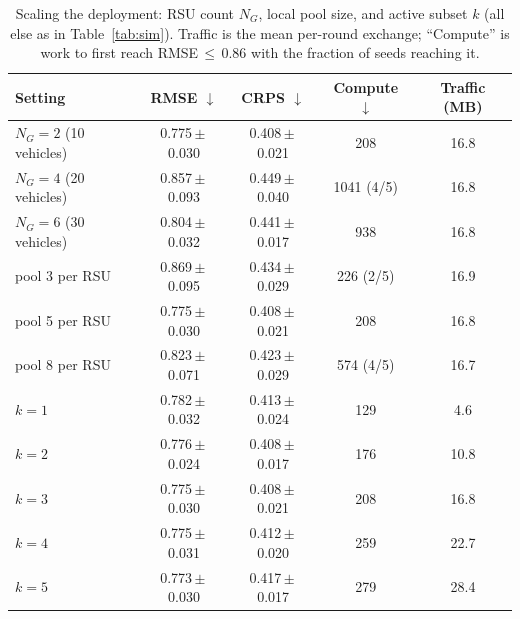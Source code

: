 \begin{table}[!t]\centering
\caption{Scaling the deployment: RSU count $N_G$, local pool size, and active subset $k$ (all else as in Table~\ref{tab:sim}). Traffic is the mean per-round exchange; ``Compute'' is work to first reach RMSE\,$\leq$\,0.86 with the fraction of seeds reaching it.}
\label{tab:scale}
\begin{tabular}{lcccc}\toprule
Setting & RMSE $\downarrow$ & CRPS $\downarrow$ & Compute $\downarrow$ & Traffic (MB) \\\midrule
$N_G=2$ (10 vehicles) & 0.775\,$\pm$\,0.030 & 0.408\,$\pm$\,0.021 & 208 & 16.8 \\
$N_G=4$ (20 vehicles) & 0.857\,$\pm$\,0.093 & 0.449\,$\pm$\,0.040 & 1041 (4/5) & 16.8 \\
$N_G=6$ (30 vehicles) & 0.804\,$\pm$\,0.032 & 0.441\,$\pm$\,0.017 & 938 & 16.8 \\
\midrule
pool 3 per RSU & 0.869\,$\pm$\,0.095 & 0.434\,$\pm$\,0.029 & 226 (2/5) & 16.9 \\
pool 5 per RSU & 0.775\,$\pm$\,0.030 & 0.408\,$\pm$\,0.021 & 208 & 16.8 \\
pool 8 per RSU & 0.823\,$\pm$\,0.071 & 0.423\,$\pm$\,0.029 & 574 (4/5) & 16.7 \\
\midrule
$k=1$ & 0.782\,$\pm$\,0.032 & 0.413\,$\pm$\,0.024 & 129 & 4.6 \\
$k=2$ & 0.776\,$\pm$\,0.024 & 0.408\,$\pm$\,0.017 & 176 & 10.8 \\
$k=3$ & 0.775\,$\pm$\,0.030 & 0.408\,$\pm$\,0.021 & 208 & 16.8 \\
$k=4$ & 0.775\,$\pm$\,0.031 & 0.412\,$\pm$\,0.020 & 259 & 22.7 \\
$k=5$ & 0.773\,$\pm$\,0.030 & 0.417\,$\pm$\,0.017 & 279 & 28.4 \\
\bottomrule\end{tabular}\end{table}
